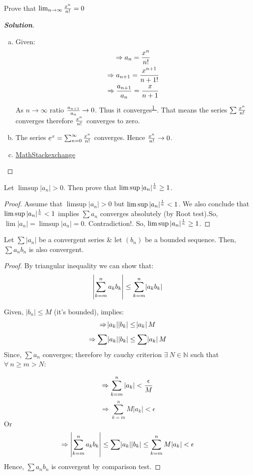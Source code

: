 \documentclass{notes}
\begin{document}
\paragraph{}
\begin{problem}
	Prove that $ \lim_{n \to \infty} {x^n \over n!} = 0$
\end{problem}

\begin{proof}[\bf Solution]
	
	\begin{enumerate}[a.]
		\item
		Given: 
		\begin{gather*}
		\Rightarrow	a_n = {x^n \over n!} \\
		\Rightarrow 	a_{n+1} = {x^{n+1} \over {n+1}!} \\
		\Rightarrow	{a_{n+1} \over a_n} = {x \over {n+1}}
		\end{gather*}
		As $ n \to \infty$ ratio ${a_{n+1} \over a_n} \to 0$. Thus it converges\textsuperscript{\href{https://math.stackexchange.com/q/712586}{1 }}. That means the series $\sum {x^n \over n!}$ converges therefore ${x^n \over n!}$ converges to zero. 
		
		\item
		The series $e^x = \sum_{n=0}^{\infty} {x^n \over n!}$ converges.
		Hence ${x^n \over n!} \to 0$.
		\item
		\href{https://math.stackexchange.com/questions/712572/prove-that-xn-n-converges-to-0-for-all-x}{MathStackexchange}
	\end{enumerate}
\end{proof}
\begin{problem}
Let $\limsup |a_n| > 0$. Then prove that $\limsup |a_n| ^ {1 \over n} \geq 1$.
\end{problem}
\begin{proof}
	Assume that $\limsup |a_n| > 0$ but $\limsup |a_n| ^ {1 \over n} < 1$.  We also conclude that $\limsup |a_n| ^ {1 \over n} < 1 $ implies $\sum a_n $ converges absolutely (by Root test).So, $\lim |a_n|=\limsup |a_n| = 0$. Contradiction!. So, $\limsup |a_n| ^ {1 \over n} \geq 1$.
\end{proof}
\begin{theorem}{}
	Let $\sum |a_n|$ be a convergent series \& let $(b_n)$ be a bounded sequence.
	Then, $\sum a_n b_n$ is also convergent.
\end{theorem}
\begin{proof}
	By triangular inequality we can show that:
	$$ \left|\sum_{k = m}^{n} a_k b_k  \right|\leq \sum_{k = m}^{n}\abs{a_k b_k}$$
	
	Given, $|b_n| \leq M$ (it's bounded), implies:
	$$ \Rightarrow \abs{a_k}\abs{b_k} \leq \abs{a_k }M$$
	$$ \Rightarrow \sum \abs{a_k}\abs{b_k} \leq \sum \abs{a_k }M$$
	Since, $\sum a_n$ converges; therefore by cauchy criterion $\exists\ N \in \mathbb{N}$ such that $\forall\ n\geq m>N$:
	
	$$\Rightarrow \sum_{k = m}^{n} |a_k| < {\epsilon \over M}$$
	$$\Rightarrow \sum_{k = m}^{n} M|a_k| < \epsilon$$
	Or
	$$\Rightarrow\left|\sum_{k = m}^{n} a_k b_k  \right|\leq \sum \abs{a_k}\abs{b_k} \leq \sum_{k = m}^{n} M|a_k| < \epsilon$$
	Hence, $\sum a_n b_n$ is convergent by comparison test.
\end{proof}
\end{document}
